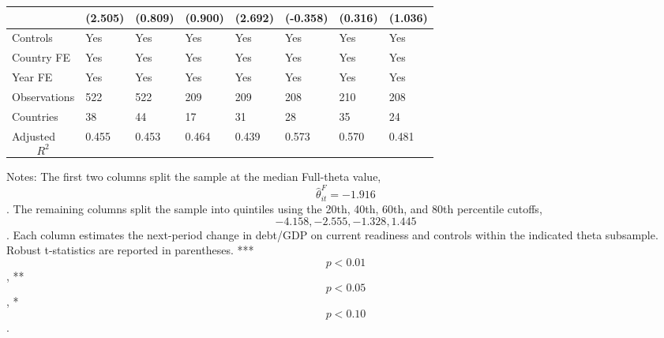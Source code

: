 \begin{table}[H]
\begin{threeparttable}
\begin{tabularx}{\textwidth}{lYYYYYYY}
  & (2.505) & (0.809) & (0.900) & (2.692) & (-0.358) & (0.316) & (1.036) \\
\midrule
Controls & Yes & Yes & Yes & Yes & Yes & Yes & Yes \\
Country FE & Yes & Yes & Yes & Yes & Yes & Yes & Yes \\
Year FE & Yes & Yes & Yes & Yes & Yes & Yes & Yes \\
Observations & 522 & 522 & 209 & 209 & 208 & 210 & 208 \\
Countries & 38 & 44 & 17 & 31 & 28 & 35 & 24 \\
Adjusted $$R^2$$ & 0.455 & 0.453 & 0.464 & 0.439 & 0.573 & 0.570 & 0.481 \\
\bottomrule
\end{tabularx}
\begin{tablenotes}[flushleft]\footnotesize
\item Notes: The first two columns split the sample at the median Full-theta value, $$\widehat{\theta}^{F}_{it}=-1.916$$. The remaining columns split the sample into quintiles using the 20th, 40th, 60th, and 80th percentile cutoffs, $$-4.158, -2.555, -1.328, 1.445$$. Each column estimates the next-period change in debt/GDP on current readiness and controls within the indicated theta subsample. Robust t-statistics are reported in parentheses. *** $$p<0.01$$, ** $$p<0.05$$, * $$p<0.10$$.
\end{tablenotes}
\end{threeparttable}
\end{table}
